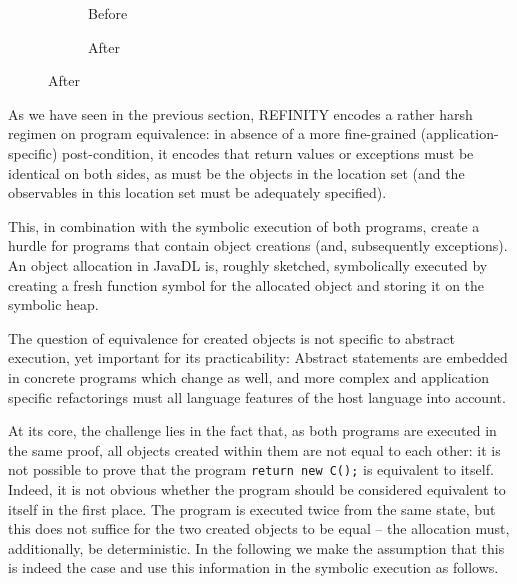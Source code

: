 
\begin{figure}
  \centering
  \begin{subfigure}{.2\linewidth}
    
    \caption{Before}
  \end{subfigure}\hspace{1cm}
  \begin{subfigure}{.2\linewidth}
    
    \caption{After}
  \end{subfigure}
\label{lst:ObjectCreation-refinity}
\end{figure}

As we have seen in the previous section, REFINITY encodes a rather harsh regimen on program equivalence:
in absence of a more fine-grained (application-specific) post-condition, it encodes that return values or exceptions must be identical on both sides,
as must be the objects in the \relevant{} location set (and the observables in this location set must be adequately specified).

This, in combination with the symbolic execution of both programs, create a hurdle for programs that contain object creations (and, subsequently exceptions).
An object allocation in JavaDL is, roughly sketched, symbolically executed by creating a fresh function symbol for the allocated object and storing it on the symbolic heap.


The question of equivalence for created objects is not specific to abstract execution, yet important for its practicability: 
Abstract statements are embedded in concrete programs which change as well, and more complex and application specific refactorings must all language features of the
host language into account.


At its core, the challenge lies in the fact that, as both programs are executed in the same proof, all objects created within them are not equal to each other: it is not possible to prove that the program \lstinline[style=refinity]|return new C();| is equivalent to itself.
Indeed, it is not obvious whether the program should be considered equivalent to itself in the first place.
The program is executed twice from the same state, but this does not suffice for the two created objects to be equal -- the allocation must, additionally, be deterministic.
In the following we make the assumption that this is indeed the case and use this information in the symbolic execution as follows.

